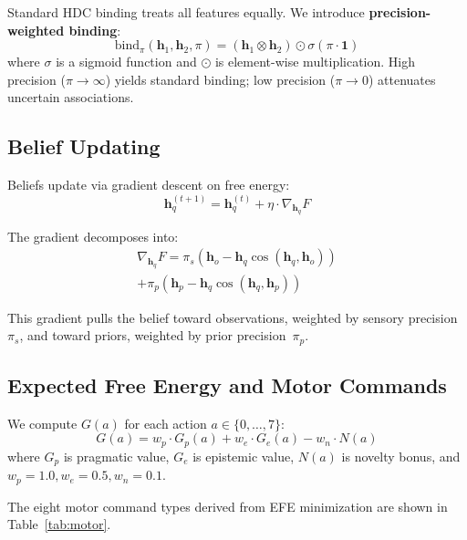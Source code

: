 \documentclass[10pt,letterpaper]{article}
\newcommand{\hvec}[1]{\mathbf{h}_{#1}}
\begin{document}
Standard HDC binding treats all features equally. We introduce \textbf{precision-weighted binding}:
\begin{equation}
\mathrm{bind}_\pi(\hvec{1}, \hvec{2}, \pi) = (\hvec{1} \otimes \hvec{2}) \odot \sigma(\pi \cdot \mathbf{1})
\end{equation}
where $\sigma$ is a sigmoid function and $\odot$ is element-wise multiplication.
High precision ($\pi \to \infty$) yields standard binding; low precision ($\pi \to 0$) attenuates uncertain associations.

\subsection{Belief Updating}

Beliefs update via gradient descent on free energy:
\begin{equation}
\hvec{q}^{(t+1)} = \hvec{q}^{(t)} + \eta \cdot \nabla_{\hvec{q}} F
\end{equation}

The gradient decomposes into:
\begin{multline}
\nabla_{\hvec{q}} F = \pi_s(\hvec{o} - \hvec{q}\cos(\hvec{q}, \hvec{o})) \\
  + \pi_p(\hvec{p} - \hvec{q}\cos(\hvec{q}, \hvec{p}))
\label{eq:gradient}
\end{multline}

This gradient pulls the belief toward observations, weighted by sensory precision~$\pi_s$, and toward priors, weighted by prior precision~$\pi_p$.

\subsection{Expected Free Energy and Motor Commands}

We compute $G(a)$ for each action $a \in \{0, \ldots, 7\}$:
\begin{equation}
G(a) = w_p \cdot G_p(a) + w_e \cdot G_e(a) - w_n \cdot N(a)
\end{equation}
where $G_p$ is pragmatic value, $G_e$ is epistemic value, $N(a)$ is novelty bonus, and $w_p=1.0, w_e=0.5, w_n=0.1$.

The eight motor command types derived from EFE minimization are shown in Table~\ref{tab:motor}.
\end{document}
